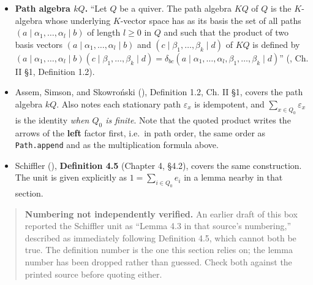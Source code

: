 \begin{itemize}
\tightlist
\item
  \textbf{Path algebra \(kQ\).} ``Let \(Q\) be a quiver. The path algebra \(KQ\) of \(Q\) is the \(K\)-algebra whose underlying \(K\)-vector space has as its basis the set of all paths \((a \mid \alpha_1, \ldots, \alpha_l \mid b)\) of length \(l \geq 0\) in \(Q\) and such that the product of two basis vectors \((a \mid \alpha_1, \ldots, \alpha_l \mid b)\) and \((c \mid \beta_1, \ldots, \beta_k \mid d)\) of \(KQ\) is defined by \((a \mid \alpha_1, \ldots, \alpha_l \mid b)(c \mid \beta_1, \ldots, \beta_k \mid d) = \delta_{bc}(a \mid \alpha_1, \ldots, \alpha_l, \beta_1, \ldots, \beta_k \mid d)\)'' (\cite{AssemSimsonSkowronski2006}, Ch. II §1, Definition 1.2).
\item
  Assem, Simson, and Skowroński (\cite{AssemSimsonSkowronski2006}), Definition 1.2, Ch. II §1, covers the path algebra \(kQ\). Also notes each stationary path \(\varepsilon_x\) is idempotent, and \(\sum_{x\in Q_0}\varepsilon_x\) is the identity \emph{when \(Q_0\) is finite}. Note that the quoted product writes the arrows of the \textbf{left} factor first, i.e.~in path order, the same order as \texttt{Path.append} and as the multiplication formula above.
\item
  Schiffler (\cite{Schiffler2014}), \textbf{Definition 4.5} (Chapter 4, §4.2), covers the same construction. The unit is given explicitly as \(1 = \sum_{i\in Q_0} e_i\) in a lemma nearby in that section.
\end{itemize}

\begin{quote}
\textbf{Numbering not independently verified.} An earlier draft of this box reported the Schiffler unit as ``Lemma 4.3 in that source's numbering,'' described as immediately following Definition 4.5, which cannot both be true. The definition number is the one this section relies on; the lemma number has been dropped rather than guessed. Check both against the printed source before quoting either.
\end{quote}
